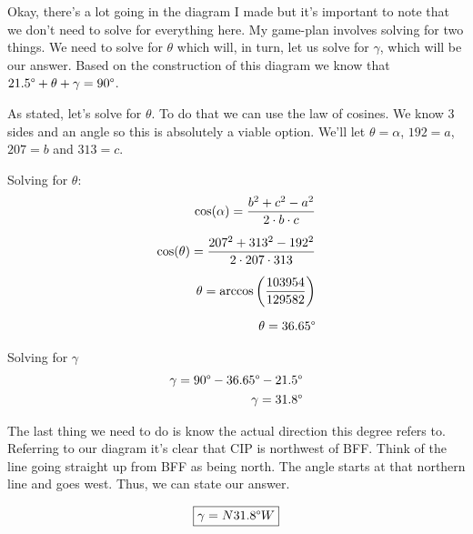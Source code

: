 \begin{solution}
    
    Okay, there's a lot going in the diagram I made but it's important to note that we don't need to solve for everything here. My game-plan involves solving for two things. We need to solve for $\theta$ which will, in turn, let us solve for $\gamma$, which will be our answer. Based on the construction of this diagram we know that $21.5\degree + \theta + \gamma = 90\degree$. \medskip
    
    As stated, let's solve for $\theta$. To do that we can use the law of cosines. We know 3 sides and an angle so this is absolutely a viable option. We'll let $\theta = \alpha$, $192 = a$, $207 = b$ and $313 = c$. \medskip
    
    Solving for $\theta$:
    \begin{align}
        \cos(\alpha) = \frac{b^2 + c^2 - a^2}{2 \cdot b \cdot c} \\[2mm]
        \cos(\theta) = \frac{207^2 + 313^2 - 192^2}{2 \cdot 207 \cdot 313} \\[2mm]
        \theta = \arccos \left( \frac{103954}{129582} \right) \\[2mm]
        \theta = 36.65\degree 
    \end{align}
    
    Solving for $\gamma$
    \begin{align}
        \gamma = 90\degree - 36.65\degree - 21.5\degree \\
        \gamma = 31.8\degree
    \end{align}
    
    The last thing we need to do is know the actual direction this degree refers to. Referring to our diagram it's clear that CIP is northwest of BFF. Think of the line going straight up from BFF as being north. The angle starts at that northern line and goes west. Thus, we can state our answer.
    
    \[\boxed{\gamma = N 31.8\degree W}\]
    
\end{solution}